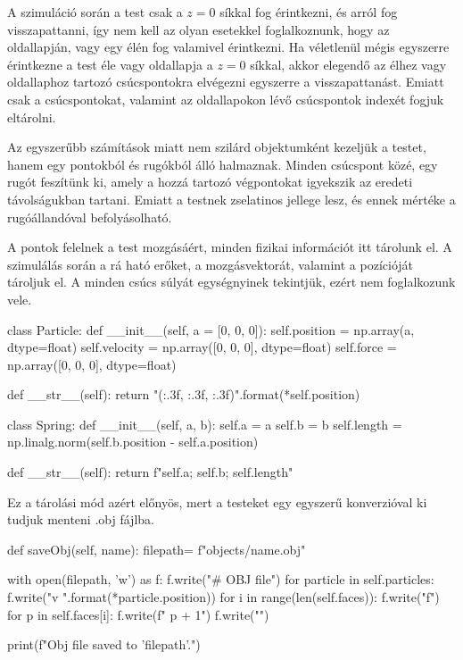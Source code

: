 

A szimuláció során a test csak a $z=0$ síkkal fog érintkezni, és arról fog visszapattanni, így nem kell az olyan esetekkel foglalkoznunk, hogy az oldallapján, vagy egy élén fog valamivel érintkezni.
Ha véletlenül mégis egyszerre érintkezne a test éle vagy oldallapja a $z=0$ síkkal, akkor elegendő az élhez vagy oldallaphoz tartozó csúcspontokra elvégezni egyszerre a visszapattanást.
Emiatt csak a csúcspontokat, valamint az oldallapokon lévő csúcspontok indexét fogjuk eltárolni.

Az egyszerűbb számítások miatt nem szilárd objektumként kezeljük a testet, 	hanem egy pontokból és rugókból álló halmaznak.
Minden csúcspont közé, egy rugót feszítünk ki, amely a hozzá tartozó végpontokat igyekszik az eredeti távolságukban tartani.
Emiatt a testnek zselatinos jellege lesz, és ennek mértéke a rugóállandóval befolyásolható.


A pontok felelnek a test mozgásáért, minden fizikai információt itt tárolunk el.
A szimulálás során a rá ható erőket, a mozgásvektorát, valamint a pozícióját tároljuk el.
A minden csúcs súlyát egységnyinek tekintjük, ezért nem foglalkozunk vele.

\begin{python}
class Particle:
    def __init__(self, a = [0, 0, 0]):
        self.position = np.array(a, dtype=float) 
        self.velocity = np.array([0, 0, 0], dtype=float)
        self.force = np.array([0, 0, 0], dtype=float)

    def __str__(self):
        return "({:.3f}, {:.3f}, {:.3f})".format(*self.position)
\end{python}


\begin{python}
class Spring:
    def __init__(self, a, b):
        self.a = a
        self.b = b
        self.length = np.linalg.norm(self.b.position - self.a.position)
	
    def __str__(self):
        return f"{self.a}; {self.b}; {self.length}"
\end{python}


Ez a tárolási mód azért előnyös, mert a testeket egy egyszerű konverzióval ki tudjuk menteni .obj fájlba.

\begin{python}
	def saveObj(self, name):
	filepath= f"objects/{name}.obj"
	
	with open(filepath, 'w') as f:
	f.write("# OBJ file\n")
	for particle in self.particles:
	f.write("v {} {} {}\n".format(*particle.position))
	for i in range(len(self.faces)):
	f.write("f")
	for p in self.faces[i]:
	f.write(f" {p + 1}")
	f.write("\n")
	
	print(f"Obj file saved to '{filepath}'.")
\end{python}

